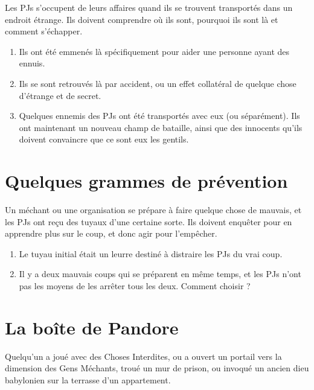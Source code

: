 \begin{multicols}{2}

Les PJs s'occupent de leurs affaires quand ils se trouvent transportés dans un endroit étrange. Ils doivent comprendre où ils sont, pourquoi ils sont là et comment s'échapper.

\themes
\begin{enumerate}
\item Ils ont été emmenés là spécifiquement pour aider une personne ayant des ennuis.
\item Ils se sont retrouvés là par accident, ou un effet collatéral de quelque chose d'étrange  et de secret.
\item Quelques ennemis des PJs ont été transportés avec eux (ou séparément). Ils ont maintenant un nouveau champ de bataille, ainsi que des innocents qu'ils doivent convaincre que ce sont eux les gentils.
\end{enumerate}

\section{Quelques grammes de prévention}
\label{prevention}


Un méchant ou une organisation se prépare à faire quelque chose de mauvais, et les PJs ont reçu des tuyaux d'une certaine sorte. Ils doivent enquêter pour en apprendre plus sur le coup, et donc agir pour l'empêcher.

\themes
\begin{enumerate}
\item Le tuyau initial était un leurre destiné à distraire les PJs du vrai coup.
\item Il y a deux mauvais coups qui se préparent en même temps, et les PJs n'ont pas les moyens de les arrêter tous les deux. Comment choisir ?
\end{enumerate}

\section{La boîte de Pandore}
\label{pandore}


Quelqu'un a joué avec des Choses Interdites, ou a ouvert un portail vers la dimension des Gens Méchants, troué un mur de prison, ou invoqué un ancien dieu babylonien sur la terrasse d'un appartement.


\end{multicols}

